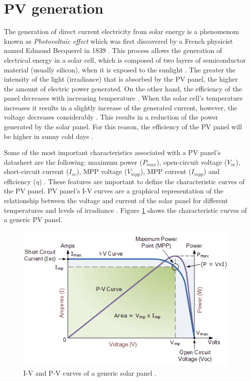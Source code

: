\section{PV generation}

The generation of direct current electricity from solar energy is a phenomenom known as \textit{Photovoltaic effect} which was first discovered by a French physicist named Edmond Becquerel in 1839 \cite{PVeffect}. This process allows the generation of electrical energy in a solar cell, which is composed of two layers of semiconductor material (usually silicon), when it is exposed to the sunlight \cite{PVeffect}. The greater the intensity of the light (irradiance) that is absorbed by the PV panel, the higher the amount of electric power generated. On the other hand, the efficiency of the panel decreases with increasing temperature \cite{handbook}. When the solar cell's temperature increases it results in a slightly increase of the generated current, however, the voltage decreases considerably \cite{handbook}. This results in a reduction of the power generated by the solar panel. For this reason, the efficiency of the PV panel will be higher in sunny cold days . 

Some of the most important characteristics associated with a PV panel’s datasheet are the following: maximum power ($P_{max}$), open-circuit voltage ($V_{oc}$), short-circuit current ($I_{sc}$), MPP voltage ($V_{mpp}$), MPP current ($I_{mpp}$) and efficiency ($\eta$) \cite{handbook}.  %
These features are important to define the characteristic curves of the PV panel. PV panel's I-V curves are a graphical representation of the relationship between the voltage and current of the solar panel for different temperatures and levels of irradiance \cite{IVcurves}. Figure \ref{fig:mpp} shows the characteristic curves of a generic PV panel. 

\begin{figure}[H]
	\begin{center}
		\includegraphics[width=0.8\linewidth]{../Pictures/IVcurve1}
		\caption{I-V and P-V curves of a generic solar panel \cite{IVcurves}.}
		\label{fig:mpp}
	\end{center}
\end{figure}


